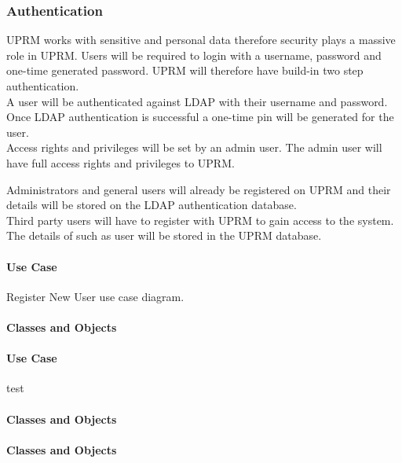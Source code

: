 
\subsubsection{Authentication}
UPRM works with sensitive and personal data therefore security plays a massive role in UPRM.
Users will be required to login with a username, password and one-time generated password. UPRM will therefore have build-in two step authentication. \\

A user will be authenticated against LDAP with their username and password. Once LDAP authentication is successful a one-time pin will be generated for the user.\\

Access rights and privileges will be set by an admin user. The admin user will have full access rights and privileges to UPRM.\\

\centerline{}

Administrators and general users will already be registered on UPRM and their details will be stored on the LDAP authentication database.\\

Third party users will have to register with UPRM to gain access to the system. The details of such as user will be stored in the UPRM database.\\

\def\toclevel@paragraph{5}
\setcounter{secnumdepth}{5}
\paragraph{Use Case\\}
Register New User use case diagram.\\
\centerline{}


\paragraph{Classes and Objects\\}





\paragraph{Use Case\\}
test

\paragraph{Classes and Objects\\}



\paragraph{Classes and Objects\\}